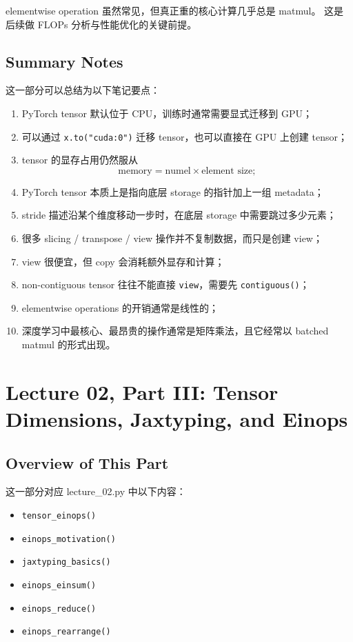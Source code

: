 \documentclass[a4paper,UTF8]{article}
\numberwithin{equation}{section}
\begin{document}
elementwise operation 虽然常见，但真正重的核心计算几乎总是 matmul。  
这是后续做 FLOPs 分析与性能优化的关键前提。

\subsection{Summary Notes}

这一部分可以总结为以下笔记要点：

\begin{enumerate}
    \item PyTorch tensor 默认位于 CPU，训练时通常需要显式迁移到 GPU；
    \item 可以通过 \verb|x.to("cuda:0")| 迁移 tensor，也可以直接在 GPU 上创建 tensor；
    \item tensor 的显存占用仍然服从
    \[
    \text{memory} = \text{numel} \times \text{element size};
    \]
    \item PyTorch tensor 本质上是指向底层 storage 的指针加上一组 metadata；
    \item stride 描述沿某个维度移动一步时，在底层 storage 中需要跳过多少元素；
    \item 很多 slicing / transpose / view 操作并不复制数据，而只是创建 view；
    \item view 很便宜，但 copy 会消耗额外显存和计算；
    \item non-contiguous tensor 往往不能直接 \verb|view|，需要先 \verb|contiguous()|；
    \item elementwise operations 的开销通常是线性的；
    \item 深度学习中最核心、最昂贵的操作通常是矩阵乘法，且它经常以 batched matmul 的形式出现。
\end{enumerate}



\section{Lecture 02, Part III: Tensor Dimensions, Jaxtyping, and Einops}

\subsection{Overview of This Part}

这一部分对应 lecture\_02.py 中以下内容：
\begin{itemize}
    \item \verb|tensor_einops()|
    \item \verb|einops_motivation()|
    \item \verb|jaxtyping_basics()|
    \item \verb|einops_einsum()|
    \item \verb|einops_reduce()|
    \item \verb|einops_rearrange()|
\end{itemize}
\end{document}
